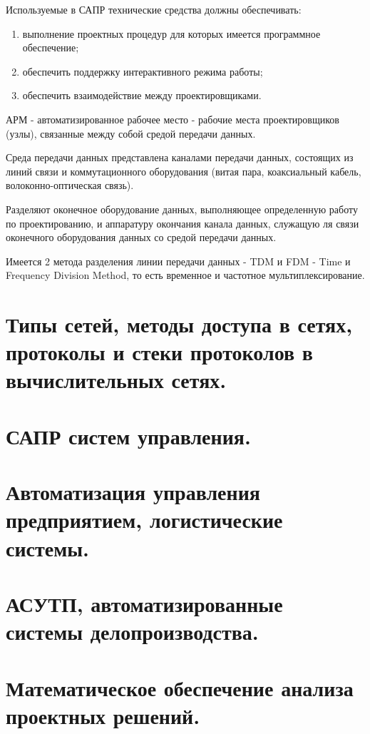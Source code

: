 \documentclass[unicode, 12pt, a4paper, oneside]{article}
\begin{document}
Используемые в САПР технические средства должны обеспечивать:

\begin{enumerate}
\item выполнение проектных процедур для которых имеется программное обеспечение;
\item обеспечить поддержку интерактивного режима работы;
\item обеспечить взаимодействие между проектировщиками.
\end{enumerate}

АРМ - автоматизированное рабочее место - рабочие места проектировщиков (узлы), связанные между собой средой передачи данных.

Среда передачи данных представлена каналами передачи данных, состоящих из линий связи и коммутационного оборудования (витая пара, коаксиальный кабель, волоконно-оптическая связь).

Разделяют оконечное оборудование данных, выполняющее определенную работу по проектированию, и аппаратуру окончания канала данных, служащую ля связи оконечного оборудования данных со средой передачи данных.

Имеется 2 метода разделения линии передачи данных - TDM и FDM - Time и Frequency Division Method, то есть временное и частотное мультиплексирование.

\section{Типы сетей, методы доступа в сетях, протоколы и стеки протоколов в вычислительных сетях.}

\section{САПР систем управления.}
\section{Автоматизация управления предприятием, логистические системы.}
\section{АСУТП, автоматизированные системы делопроизводства.}
\section{Математическое обеспечение анализа проектных решений.}
\end{document}
